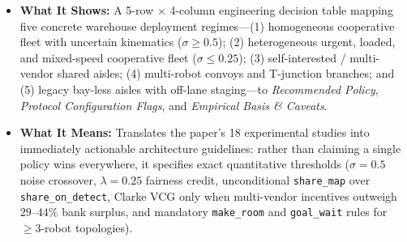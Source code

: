 \documentclass[10pt,a4paper]{article}
\begin{document}
\begin{itemize}
  \item \textbf{What It Shows:} A 5-row $\times$ 4-column engineering decision table mapping five concrete warehouse deployment regimes---(1) homogeneous cooperative fleet with uncertain kinematics ($\sigma\ge 0.5$); (2) heterogeneous urgent, loaded, and mixed-speed cooperative fleet ($\sigma\le 0.25$); (3) self-interested / multi-vendor shared aisles; (4) multi-robot convoys and T-junction branches; and (5) legacy bay-less aisles with off-lane staging---to \emph{Recommended Policy}, \emph{Protocol Configuration Flags}, and \emph{Empirical Basis \& Caveats}.
  \item \textbf{What It Means:} Translates the paper's 18 experimental studies into immediately actionable architecture guidelines: rather than claiming a single policy wins everywhere, it specifies exact quantitative thresholds ($\sigma=0.5$ noise crossover, $\lambda=0.25$ fairness credit, unconditional \texttt{share\_map} over \texttt{share\_on\_detect}, Clarke VCG only when multi-vendor incentives outweigh $29$--$44\%$ bank surplus, and mandatory \texttt{make\_room} and \texttt{goal\_wait} rules for $\ge 3$-robot topologies).
\end{itemize}
\end{document}
